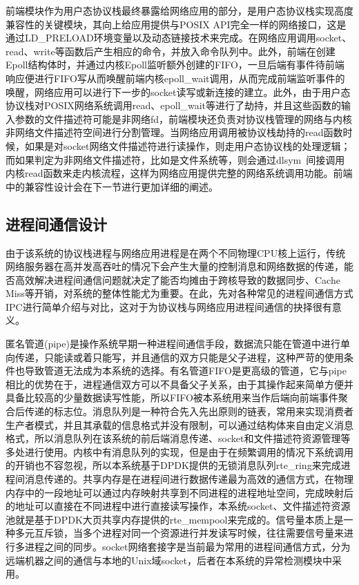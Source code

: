前端模块作为用户态协议栈最终暴露给网络应用的部分，是用户态协议栈实现高度兼容性的关键模块，其向上给应用提供与POSIX API完全一样的网络接口，这是通过LD\_PRELOAD环境变量以及动态链接技术来完成。在网络应用调用socket、read、write等函数后产生相应的命令，并放入命令队列中。此外，前端在创建Epoll结构体时，并通过内核Epoll监听额外创建的FIFO，一旦后端有事件待前端响应便进行FIFO写从而唤醒前端内核epoll\_wait调用，从而完成前端监听事件的唤醒，网络应用可以进行下一步的socket读写或新连接的建立。此外，由于用户态协议栈对POSIX网络系统调用read、epoll\_wait等进行了劫持，并且这些函数的输入参数的文件描述符可能是非网络fd，前端模块还负责对协议栈管理的网络与内核非网络文件描述符空间进行分割管理。当网络应用调用被协议栈劫持的read函数时候，如果是对socket网络文件描述符进行读操作，则走用户态协议栈的处理逻辑；而如果判定为非网络文件描述符，比如是文件系统等，则会通过dlsym~\cite{DLSYM}间接调用内核read函数来走内核流程，这样为网络应用提供完整的网络系统调用功能。前端中的兼容性设计会在下一节进行更加详细的阐述。

\subsection{进程间通信设计}
由于该系统的协议栈进程与网络应用进程是在两个不同物理CPU核上运行，传统网络服务器在高并发高吞吐的情况下会产生大量的控制消息和网络数据的传递，能否高效解决进程间通信问题就决定了能否均摊由于跨核导致的数据同步、Cache Miss等开销，对系统的整体性能尤为重要。在此，先对各种常见的进程间通信方式IPC进行简单介绍与对比，这对于为协议栈与网络应用进程间通信的抉择很有意义。

匿名管道(pipe)是操作系统早期一种进程间通信手段，数据流只能在管道中进行单向传递，只能读或着只能写，并且通信的双方只能是父子进程，这种严苛的使用条件也导致管道无法成为本系统的选择。有名管道FIFO是更高级的管道，它与pipe相比的优势在于，进程通信双方可以不具备父子关系，由于其操作起来简单方便并具备比较高的少量数据读写性能，所以FIFO被本系统用来当作后端向前端事件聚合后传递的标志位。消息队列是一种符合先入先出原则的链表，常用来实现消费者生产者模式，并且其承载的信息格式并没有限制，可以通过结构体来自由定义消息格式，所以消息队列在该系统的前后端消息传递、socket和文件描述符资源管理等多处进行使用。内核中有消息队列的实现，但是由于在频繁调用的情况下系统调用的开销也不容忽视，所以本系统基于DPDK提供的无锁消息队列rte\_ring来完成进程间消息传递的。共享内存是在进程间进行数据传递最为高效的通信方式，在物理内存中的一段地址可以通过内存映射共享到不同进程的进程地址空间，完成映射后的地址可以直接在不同进程中进行直接读写操作，本系统socket、文件描述符资源池就是基于DPDK大页共享内存提供的rte\_mempool来完成的。信号量本质上是一种多元互斥锁，当多个进程对同一个资源进行并发读写时候，往往需要信号量来进行多进程之间的同步。socket网络套接字是当前最为常用的进程间通信方式，分为远端机器之间的通信与本地的Unix域socket，后者在本系统的异常检测模块中采用。

